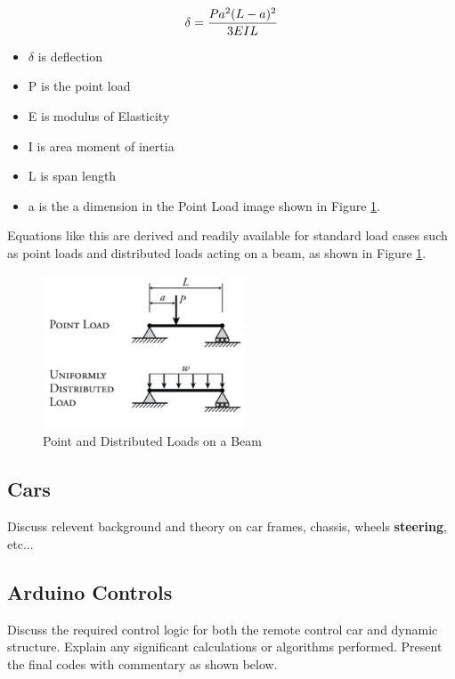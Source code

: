 \documentclass[fleqn,12pt]{project}
\begin{document}
\begin{equation}
	\delta = \frac{Pa^2(L-a)^2}{3EIL} \\
\label{eq:delta}
\end{equation}

\begin{itemize}
\item $\delta$ is deflection
\item P is the point load
\item E is modulus of Elasticity
\item I is area moment of inertia
\item L is span length
\item a is the a dimension in the Point Load image shown in Figure \ref{fig:Fig2}.
\end{itemize}

Equations like this are derived and readily available for standard load cases such as point loads and distributed loads acting on a beam, as shown in Figure \ref{fig:Fig2}.
\begin{figure}\centering
\includegraphics[width=6cm]{Figures/Loads}
\caption{Point and Distributed Loads on a Beam \cite{bib:Mechanics}}
\label{fig:Fig2}
\end{figure}

\subsection{Cars}

Discuss relevent background and theory on car frames, chassis, wheels \textbf{steering}, etc...

\subsection{Arduino Controls}
Discuss the required control logic for both the remote control car and dynamic structure. Explain any significant calculations or algorithms performed. Present the final codes with commentary as shown below.

\begin{tcolorbox}[breakable, title=\textbf{fade.h}]

\end{tcolorbox}
\end{document}
